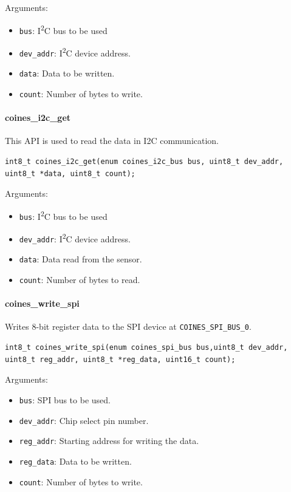 Arguments:
\begin{itemize}
	\item \texttt{bus}: I\textsuperscript{2}C bus to be used
	\item \texttt{dev\_addr}: I\textsuperscript{2}C device address.
	\item \texttt{data}: Data to be written.
	\item \texttt{count}: Number of bytes to write.
\end{itemize}

\paragraph{coines\_i2c\_get}
This API is used to read the data in I2C communication.

\begin{lstlisting}
int8_t coines_i2c_get(enum coines_i2c_bus bus, uint8_t dev_addr, uint8_t *data, uint8_t count);
\end{lstlisting}

Arguments:
\begin{itemize}
	\item \texttt{bus}: I\textsuperscript{2}C bus to be used
	\item \texttt{dev\_addr}: I\textsuperscript{2}C device address.
	\item \texttt{data}: Data read from the sensor.
	\item \texttt{count}: Number of bytes to read.
\end{itemize}

\paragraph{coines\_write\_spi}\label{CoinesWriteSpi}
Writes 8-bit register data to the SPI device at \texttt{COINES\_SPI\_BUS\_0}.

\begin{lstlisting}
int8_t coines_write_spi(enum coines_spi_bus bus,uint8_t dev_addr, uint8_t reg_addr, uint8_t *reg_data, uint16_t count);
\end{lstlisting}

Arguments:
\begin{itemize}
	\item \texttt{bus}: SPI bus to be used.
	\item \texttt{dev\_addr}: Chip select pin number.
	\item \texttt{reg\_addr}: Starting address for writing the data.
	\item \texttt{reg\_data}: Data to be written.
	\item \texttt{count}: Number of bytes to write.
\end{itemize}

